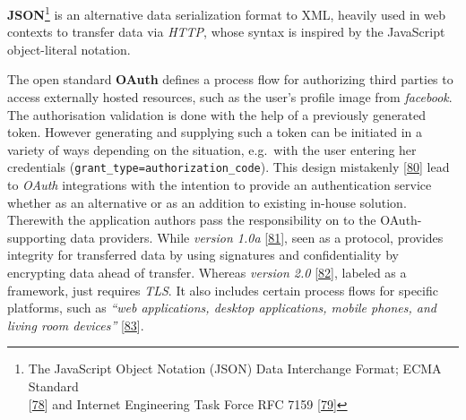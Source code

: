 \documentclass[12pt,english,a4paper,titlepage,cleardoublepage=empty,dottedtoc]{report}
\begin{document}
\textbf{JSON}\footnote{The JavaScript Object Notation (JSON) Data
  Interchange Format; ECMA Standard\\
  {[}\protect\hyperlink{ref-web_spec_json}{78}{]} and Internet
  Engineering Task Force RFC 7159
  {[}\protect\hyperlink{ref-web_rfc_json}{79}{]}} is an alternative data
serialization format to XML, heavily used in web contexts to transfer
data via \emph{HTTP}, whose syntax is inspired by the JavaScript
object-literal notation.

The open standard \textbf{OAuth} defines a process flow for authorizing
third parties to access externally hosted resources, such as the user's
profile image from \emph{facebook}. The authorisation validation is done
with the help of a previously generated token. However generating and
supplying such a token can be initiated in a variety of ways depending
on the situation, e.g.~with the user entering her credentials
(\texttt{grant\_type=authorization\_code}). This design mistakenly
{[}\protect\hyperlink{ref-web_2012_problem-with-oauth-for-authentication}{80}{]}
lead to \emph{OAuth} integrations with the intention to provide an
authentication service whether as an alternative or as an addition to
existing in-house solution. Therewith the application authors pass the
responsibility on to the OAuth-supporting data providers. While
\emph{version 1.0a} {[}\protect\hyperlink{ref-web_spec_oauth-1a}{81}{]},
seen as a protocol, provides integrity for transferred data by using
signatures and confidentiality by encrypting data ahead of transfer.
Whereas \emph{version 2.0}
{[}\protect\hyperlink{ref-web_spec_oauth-2}{82}{]}, labeled as a
framework, just requires \emph{TLS}. It also includes certain process
flows for specific platforms, such as \emph{``web applications, desktop
applications, mobile phones, and living room devices''}
{[}\protect\hyperlink{ref-web_2016_oauth-2}{83}{]}.
\end{document}
